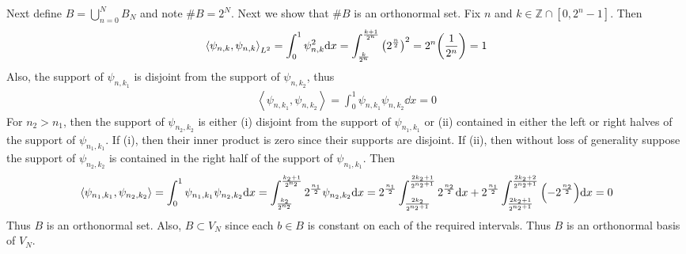 \documentclass{article} %
\theoremstyle{plain}
\newcommand{\VEC}[2]{\left\langle #1, #2 \right\rangle}
\numberwithin{equation}{section} %
\numberwithin{figure}{section} %
\numberwithin{table}{section} %
\begin{document}
Next define $B = \bigcup_{n=0}^N B_N$ and note $\#B = 2^N$.  Next we show that $\#B$ is an orthonormal set.  Fix $n$ and $k \in \mathbb{Z}\cap[0, 2^n -1]$.  Then
\begin{align*}
    \VEC{\psi_{n,k}}{\psi_{n,k}}_{L^2} = \int_0^1 \psi_{n,k}^2 \dd x = \int_{\frac{k}{2^n}}^{\frac{k+1}{2^n}} \qty(2^{\frac{n}{2}})^2 = 2^n\qty(\frac{1}{2^n}) = 1
\end{align*}
Also, the support of $\psi_{n,k_1}$ is disjoint from the support of $\psi_{n,k_2}$, thus
\begin{align*}
    \VEC{\psi_{n,k_1}}{\psi_{n,k_2}} = \int_0^1 \psi_{n, k_1}\psi_{n,k_2}\dd x = 0
\end{align*}
For $n_2 > n_1$, then the support of $\psi_{n_2, k_2}$ is either (i) disjoint from the support of $\psi_{n_1, k_1}$ or (ii) contained in either the left or right halves of the support of $\psi_{n_1, k_1}$.  If (i), then their inner product is zero since their supports are disjoint.  If (ii), then without loss of generality suppose the support of $\psi_{n_2,k_2}$ is contained in the right half of the support of $\psi_{n_1,k_1}$.  Then
\begin{align*}
    \VEC{\psi_{n_1, k_1}}{\psi_{n_2, k_2}} = \int_0^1 \psi_{n_1,k_1}\psi_{n_2,k_2} \dd x = \int_{\frac{k_2}{2^{n_2}}}^{\frac{k_2+1}{2^{n_2}}}2^{\frac{n_1}{2}}\psi_{n_2,k_2}\dd x = 2^{\frac{n_1}{2}}\int_{\frac{2k_2}{2^{n_2 + 1}}}^{\frac{2k_2 + 1}{2^{n_2 + 1}}} 2^{\frac{n_2}{2}} \dd x + 2^{\frac{n_1}{2}}\int_{\frac{2k_2 + 1}{2^{n_2 + 1}}}^{\frac{2k_2 + 2}{2^{n_2 + 1}}} \qty(-2^{\frac{n_2}{2}}) \dd x = 0
\end{align*}
Thus $B$ is an orthonormal set.  Also, $B \subset V_N$ since each $b \in B$ is constant on each of the required intervals.  Thus $B$ is an orthonormal basis of $V_N$.
\end{document}
